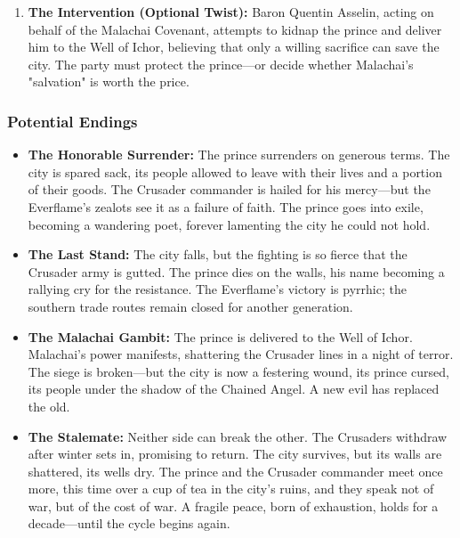 \documentclass[11pt]{article}
\begin{document}
\begin{enumerate}
\begin{itemize}
        \item \textit{Accept the Inevitable:} The prince orders the garrison to lay down their arms—not in surrender, but to spare the city from sack. He walks out to meet the Crusader commander, his sword held out, hilt first (ends the siege immediately; the city is spared mass slaughter, but the prince must endure the shame of capitulation and the Crusaders' demands).
    \end{itemize}
    \item \textbf{The Intervention (Optional Twist):} Baron Quentin Asselin, acting on behalf of the Malachai Covenant, attempts to kidnap the prince and deliver him to the Well of Ichor, believing that only a willing sacrifice can save the city. The party must protect the prince—or decide whether Malachai's "salvation" is worth the price.
\end{enumerate}

\subsubsection{Potential Endings}

\begin{itemize}
    \item \textbf{The Honorable Surrender:} The prince surrenders on generous terms. The city is spared sack, its people allowed to leave with their lives and a portion of their goods. The Crusader commander is hailed for his mercy—but the Everflame's zealots see it as a failure of faith. The prince goes into exile, becoming a wandering poet, forever lamenting the city he could not hold.
    \item \textbf{The Last Stand:} The city falls, but the fighting is so fierce that the Crusader army is gutted. The prince dies on the walls, his name becoming a rallying cry for the resistance. The Everflame's victory is pyrrhic; the southern trade routes remain closed for another generation.
    \item \textbf{The Malachai Gambit:} The prince is delivered to the Well of Ichor. Malachai's power manifests, shattering the Crusader lines in a night of terror. The siege is broken—but the city is now a festering wound, its prince cursed, its people under the shadow of the Chained Angel. A new evil has replaced the old.
    \item \textbf{The Stalemate:} Neither side can break the other. The Crusaders withdraw after winter sets in, promising to return. The city survives, but its walls are shattered, its wells dry. The prince and the Crusader commander meet once more, this time over a cup of tea in the city's ruins, and they speak not of war, but of the cost of war. A fragile peace, born of exhaustion, holds for a decade—until the cycle begins again.
\end{itemize}
\end{document}

